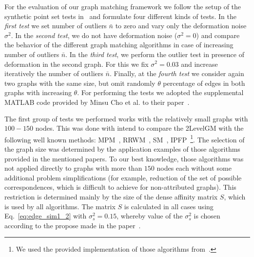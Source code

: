 For the evaluation of our graph matching framework we follow the setup of the synthetic point set tests in~\cite{Cho2014_Haystack,FastPFP} and formulate four different kinds of tests. In the \emph{first test} we set number of outliers $\bar{n}$ to zero and vary only the deformation noise $\sigma^2$. In the \emph{second test}, we do not have deformation noise ($\sigma^2=0$) and compare the behavior of the different graph matching algorithms in case of increasing number of outliers $\bar{n}$. In the \emph{third test}, we perform the outlier test in presence of deformation in the second graph. For this we fix $\sigma^2= 0.03$ and increase iteratively the number of outliers $\bar{n}$. Finally, at the \emph{fourth test} we consider again two graphs with the same size, but omit randomly $\theta$ percentage of edges in both graphs with increasing $\theta$. 
For performing the tests we adopted the supplemental MATLAB code provided by Minsu Cho et al. to their paper~\cite{Cho2014_Haystack,code_MPM}. 

The first group of tests we performed works with the relatively small graphs with $100-150$ nodes. This was done with intend to compare the 2LevelGM with the following well known methods: MPM~\cite{Cho2014_Haystack}, RRWM~\cite{Cho2010_RRWM}, SM~\cite{Leordeanu2005_SM}, IPFP~\cite{Leordeanu2009_IPFP}\footnote{We used the provided implementation of those algorithms from~\cite{code_MPM}.}. The selection of the graph size was determined by the application examples of those algorithms provided in the mentioned papers. To our best knowledge, those algorithms was not applied directly to graphs with more than $150$ nodes each without some additional problem simplifications (for example, reduction of the set of possible correspondences, which is difficult to achieve for non-attributed graphs). This restriction is determined mainly by the size of the dense affinity matrix $S$, which is used by all algorithms. The matrix $S$ is calculated in all cases using Eq.~\eqref{eq:edge_sim1_2} with $\sigma_s^2=0.15$, whereby value of the $\sigma_s^2$ is chosen according to the propose made in the paper~\cite{Cho2010_RRWM}.

